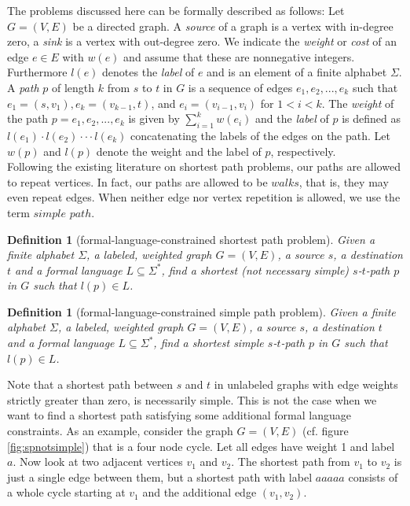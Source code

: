 \documentclass[]{article}
\newtheorem{definition}[theorem]{Definition}
\numberwithin{equation}{section}
\begin{document}
The problems discussed here can be formally described as follows: Let $G=(V,E)$ be a directed graph. A \textit{source} of a graph is a vertex with in-degree zero, a \textit{sink} is a vertex with out-degree zero. We indicate the \textit{weight} or \textit{cost} of an edge $e \in E$ with $w(e)$ and assume that these are nonnegative integers. Furthermore $l(e)$ denotes the \textit{label} of $e$ and is an element of a finite alphabet $\Sigma$.\\

A \textit{path} $p$ of length $k$ from $s$ to $t$ in $G$ is a sequence of edges $e_1, e_2, ...,e_k$ such that $e_1 = (s, v_1), e_k = (v_{k-1},t)$, and $e_i = (v_{i-1}, v_i)$ for $1 < i < k$. The \textit{weight} of the path $p = e_1, e_2, ..., e_k$ is given by $\sum_{i=1}^{k} w(e_i)$ and the \textit{label} of $p$ is defined as $l(e_1) \cdot l(e_2) \cdot \cdot \cdot l(e_k)$ concatenating the labels of the edges on the path. Let $w(p)$ and $l(p)$ denote the weight and the label of $p$, respectively.\\

Following the existing literature on shortest path problems, our paths are allowed to repeat vertices. In fact, our paths are allowed to be $walks$, that is, they may even repeat edges. When neither edge nor vertex repetition is allowed, we use the term $simple$ $path$.

\begin{definition}[formal-language-constrained shortest path problem]
	\label{def:langconshp}
	Given a finite alphabet $\Sigma$, a labeled, weighted graph $G = (V,E)$, a source $s$, a destination $t$ and a formal language $L\subseteq \Sigma^*$, find a shortest (not necessary simple) $s$-$t$-path $p$ in $G$ such that $l(p) \in L$.
\end{definition}

\begin{definition}[formal-language-constrained simple path problem]
	\label{def:langconsip}
	Given a finite alphabet $\Sigma$, a labeled, weighted graph $G = (V,E)$, a source $s$, a destination $t$ and a formal language $L\subseteq \Sigma^*$, find a shortest simple $s$-$t$-path $p$ in $G$ such that $l(p) \in L$.
\end{definition}

Note that a shortest path between $s$ and $t$ in unlabeled graphs with edge weights strictly greater than zero, is necessarily simple. This is not the case when we want to find a shortest path satisfying some additional formal language constraints. As an example, consider the graph $G=(V,E)$ (cf. figure \ref{fig:spnotsimple}) that is a four node cycle. Let all edges have weight 1 and label $a$. Now look at two adjacent vertices $v_1$ and $v_2$. The shortest path from $v_1$ to $v_2$ is just a single edge between them, but a shortest path with label $aaaaa$ consists of a whole cycle starting at $v_1$ and the additional edge $(v_1, v_2)$.\\
\end{document}
